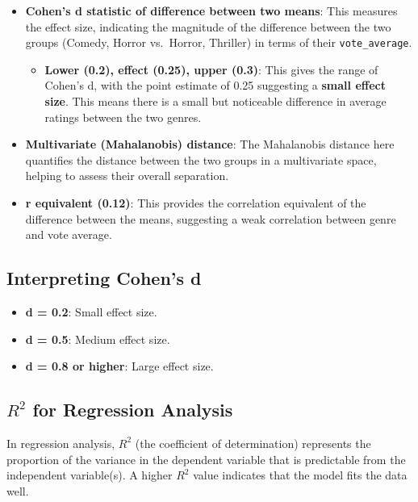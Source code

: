 \documentclass[
]{book}
\providecommand{\tightlist}{%
  \setlength{\itemsep}{0pt}\setlength{\parskip}{0pt}}
\begin{document}
\begin{itemize}
\tightlist
\item
  \textbf{Cohen's d statistic of difference between two means}: This measures the effect size, indicating the magnitude of the difference between the two groups (Comedy, Horror vs.~Horror, Thriller) in terms of their \texttt{vote\_average}.

  \begin{itemize}
  \tightlist
  \item
    \textbf{Lower (0.2), effect (0.25), upper (0.3)}: This gives the range of Cohen's d, with the point estimate of 0.25 suggesting a \textbf{small effect size}. This means there is a small but noticeable difference in average ratings between the two genres.
  \end{itemize}
\item
  \textbf{Multivariate (Mahalanobis) distance}: The Mahalanobis distance here quantifies the distance between the two groups in a multivariate space, helping to assess their overall separation.
\item
  \textbf{r equivalent (0.12)}: This provides the correlation equivalent of the difference between the means, suggesting a weak correlation between genre and vote average.
\end{itemize}

\subsection*{Interpreting Cohen's d}\label{interpreting-cohens-d}

\begin{itemize}
\tightlist
\item
  \textbf{d = 0.2}: Small effect size.
\item
  \textbf{d = 0.5}: Medium effect size.
\item
  \textbf{d = 0.8 or higher}: Large effect size.
\end{itemize}

\subsection*{\texorpdfstring{\(R^2\) for Regression Analysis}{R\^{}2 for Regression Analysis}}\label{r2-for-regression-analysis}

In regression analysis, \(R^2\) (the coefficient of determination) represents the proportion of the variance in the dependent variable that is predictable from the independent variable(s). A higher \(R^2\) value indicates that the model fits the data well.
\end{document}
